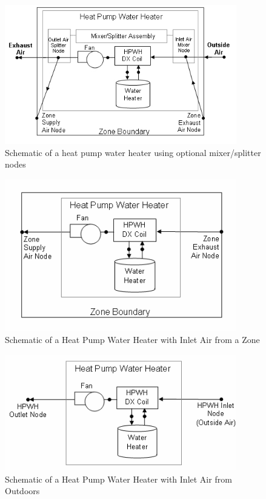 \begin{figure}[hbtp] %
\centering
\includegraphics[width=0.9\textwidth, height=0.9\textheight, keepaspectratio=true]{media/image6855.png}
\caption{Schematic of a heat pump water heater using optional mixer/splitter nodes \protect \label{fig:schematic-of-a-heat-pump-water-heater-using-001}}
\end{figure}

\begin{figure}[hbtp] %
\centering
\includegraphics[width=0.9\textwidth, height=0.9\textheight, keepaspectratio=true]{media/image6856.png}
\caption{Schematic of a Heat Pump Water Heater with Inlet Air from a Zone \protect \label{fig:schematic-of-a-heat-pump-water-heater-with}}
\end{figure}

\begin{figure}[hbtp] %
\centering
\includegraphics[width=0.9\textwidth, height=0.9\textheight, keepaspectratio=true]{media/image6857.png}
\caption{Schematic of a Heat Pump Water Heater with Inlet Air from Outdoors \protect \label{fig:schematic-of-a-heat-pump-water-heater-with-001}}
\end{figure}


